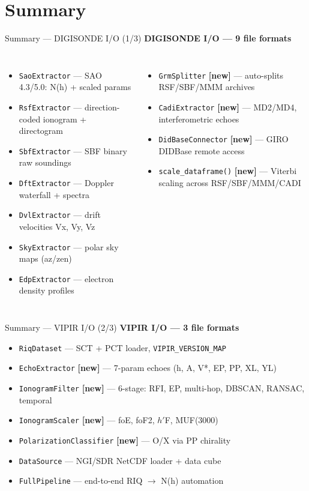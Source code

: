 \documentclass[aspectratio=169,11pt]{beamer}
\begin{document}
\section{Summary}

\begin{frame}{Summary — DIGISONDE I/O (1/3)}
  \textbf{DIGISONDE I/O — 9 file formats}
  \begin{columns}[T]
    \begin{itemize}\small
      \item \texttt{SaoExtractor} — SAO 4.3/5.0: N(h) + scaled params
      \item \texttt{RsfExtractor} — direction-coded ionogram + directogram
      \item \texttt{SbfExtractor} — SBF binary raw soundings
      \item \texttt{DftExtractor} — Doppler waterfall + spectra
      \item \texttt{DvlExtractor} — drift velocities Vx, Vy, Vz
      \item \texttt{SkyExtractor} — polar sky maps (az/zen)
      \item \texttt{EdpExtractor} — electron density profiles
    \end{itemize}
    \begin{itemize}\small
      \item \texttt{GrmSplitter} \textbf{[new]} — auto-splits RSF/SBF/MMM archives
      \item \texttt{CadiExtractor} \textbf{[new]} — MD2/MD4, interferometric echoes
      \item \texttt{DidBaseConnector} \textbf{[new]} — GIRO DIDBase remote access
      \item \texttt{scale\_dataframe()} \textbf{[new]} — Viterbi scaling across
            RSF/SBF/MMM/CADI
    \end{itemize}
  \end{columns}
\end{frame}

\begin{frame}{Summary — VIPIR I/O (2/3)}
  \textbf{VIPIR I/O — 3 file formats}
  \begin{itemize}\small
    \item \texttt{RiqDataset} — SCT + PCT loader, \texttt{VIPIR\_VERSION\_MAP}
    \item \texttt{EchoExtractor} \textbf{[new]} — 7-param echoes (h, A, V*, EP, PP, XL, YL)
    \item \texttt{IonogramFilter} \textbf{[new]} — 6-stage: RFI, EP, multi-hop, DBSCAN, RANSAC, temporal
    \item \texttt{IonogramScaler} \textbf{[new]} — foE, foF2, $h'$F, MUF(3000)
    \item \texttt{PolarizationClassifier} \textbf{[new]} — O/X via PP chirality
    \item \texttt{DataSource} — NGI/SDR NetCDF loader + data cube
    \item \texttt{FullPipeline} — end-to-end RIQ $\to$ N(h) automation
  \end{itemize}
\end{frame}
\end{document}
